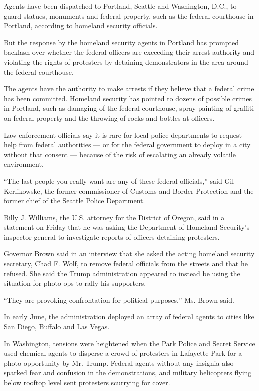 Agents have been dispatched to Portland, Seattle and Washington, D.C.,
to guard statues, monuments and federal property, such as the federal
courthouse in Portland, according to homeland security officials.

But the response by the homeland security agents in Portland has
prompted backlash over whether the federal officers are exceeding their
arrest authority and violating the rights of protesters by detaining
demonstrators in the area around the federal courthouse.

The agents have the authority to make arrests if they believe that a
federal crime has been committed. Homeland security has pointed to
dozens of possible crimes in Portland, such as damaging of the federal
courthouse, spray-painting of graffiti on federal property and the
throwing of rocks and bottles at officers.

Law enforcement officials say it is rare for local police departments to
request help from federal authorities --- or for the federal government
to deploy in a city without that consent --- because of the risk of
escalating an already volatile environment.

``The last people you really want are any of these federal officials,''
said Gil Kerlikowske, the former commissioner of Customs and Border
Protection and the former chief of the Seattle Police Department.

Billy J. Williams, the U.S. attorney for the District of Oregon, said in
a statement on Friday that he was asking the Department of Homeland
Security's inspector general to investigate reports of officers
detaining protesters.

Governor Brown said in an interview that she asked the acting homeland
security secretary, Chad F. Wolf, to remove federal officials from the
streets and that he refused. She said the Trump administration appeared
to instead be using the situation for photo-ops to rally his supporters.

``They are provoking confrontation for political purposes,'' Ms. Brown
said.

In early June, the administration deployed an array of federal agents to
cities like San Diego, Buffalo and Las Vegas.

In Washington, tensions were heightened when the Park Police and Secret
Service used chemical agents to disperse a crowd of protesters in
Lafayette Park for a photo opportunity by Mr. Trump. Federal agents
without any insignia also sparked fear and confusion in the
demonstrations, and
\href{https://www.nytimes3xbfgragh.onion/2020/06/06/us/politics/protests-trump-helicopters-national-guard.html}{military
helicopters} flying below rooftop level sent protesters scurrying for
cover.


